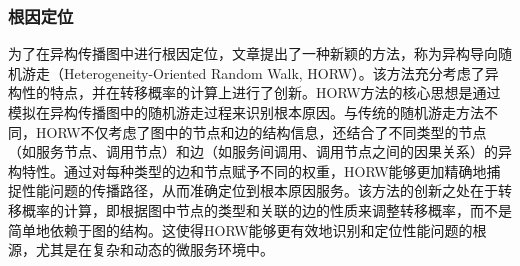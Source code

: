 \subsubsection{根因定位}

为了在异构传播图中进行根因定位，文章提出了一种新颖的方法，称为异构导向随机游走（Heterogeneity-Oriented Random Walk, HORW）。该方法充分考虑了异构性的特点，并在转移概率的计算上进行了创新。HORW方法的核心思想是通过模拟在异构传播图中的随机游走过程来识别根本原因。与传统的随机游走方法不同，HORW不仅考虑了图中的节点和边的结构信息，还结合了不同类型的节点（如服务节点、调用节点）和边（如服务间调用、调用节点之间的因果关系）的异构特性。通过对每种类型的边和节点赋予不同的权重，HORW能够更加精确地捕捉性能问题的传播路径，从而准确定位到根本原因服务。该方法的创新之处在于转移概率的计算，即根据图中节点的类型和关联的边的性质来调整转移概率，而不是简单地依赖于图的结构。这使得HORW能够更有效地识别和定位性能问题的根源，尤其是在复杂和动态的微服务环境中。
